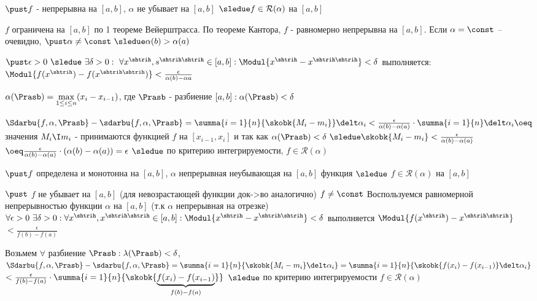 \begin{proofs}
	$\pust f$ - непрерывна на $[a,b]$, $\alpha$ не убывает на $[a,b]$ $\sledue f \in \mathcal{R}(\alpha)$ на $[a,b]$
	\begin{dokvo}
		$f$ ограничена на $[a,b]$ по 1 теореме Вейерштрасса. По теореме Кантора, $f$ - равномерно непрерывна на $[a,b]$. Если $\alpha = \const$ -- очевидно, $\pust \alpha \neq \const \ \sledue \alpha(b) > \alpha(a)$

		$\pust \epsilon > 0 \ \sledue \ \exists \delta >0: \ \forall x^{\shtrih}, s^{\shtrih\shtrih} \in [a,b]: \Modul{x^{\shtrih} - x^{\shtrih\shtrih}} < \delta$ выполняется: $\Modul{f(x^{\shtrih}) - f(x^{\shtrih\shtrih})} < \frac{\epsilon}{\alpha(b) - \alpha{a}}$

		$\alpha(\Prasb) = \max\limits_{1 \leq i \leq n}(x_i - x_{i-1})$, где $\Prasb$ - разбиение $[a,b]: \alpha(\Prasb) < \delta$

		$\Sdarbu{f,\alpha,\Prasb} - \sdarbu{f,\alpha, \Prasb} = \summa{i=1}{n}{\skobk{M_i - m_i}}\delt\alpha_i < \frac{\epsilon}{\alpha(b) - \alpha(a)} \cdot \summa{i=1}{n}\delt\alpha_i \oeq$ значения $M_i \I m_i$ - принимаются функцией $f$ на $[x_{i-1}, x_i]$ и так как $\alpha(\Prasb) < \delta \ \sledue \skobk{M_i - m_i} < \frac{\epsilon}{\alpha(b) - \alpha(a)}$ $\oeq \frac{\epsilon}{\alpha(b)- \alpha(a)}\cdot (\alpha(b)- \alpha(a)) = \epsilon$ $\sledue$ по критерию интегрируемости, $f \in \mathcal{R}(\alpha)$
	\end{dokvo}
\end{proofs}

\begin{proofs}
	$\pust f$ определена и монотонна на $[a,b]$, $\alpha$ непрерывная неубывающая на $[a,b]$ функция $\sledue$ $f \in \mathcal{R}(\alpha)$ на $[a,b]$
	\begin{dokvo}
		$\pust$ $f$ не убывает на $[a,b]$ (для невозрастающей функции док->во аналогично) $f \neq \const$ Воспользуемся равномерной непрерывностью функции $\alpha$ на $[a,b]$ (т.к $\alpha$ непрерывная на отрезке)
		$\forall \epsilon > 0 \ \exists \delta > 0 : \forall x^{\shtrih}, x^{\shtrih\shtrih} \in [a,b]: \Modul{x^{\shtrih} - x^{\shtrih\shtrih}} < \delta$
		выполняется $\Modul{f(x^{\shtrih}) - x^{\shtrih\shtrih}}$ $< \frac{\epsilon}{f(b)-f(a)}$

		Возьмем $\forall$ разбиение $\Prasb: \lambda(\Prasb) < \delta$, $\Sdarbu{f,\alpha,\Prasb} - \sdarbu{f,\alpha, \Prasb} = \summa{i=1}{n}{\skobk{M_i - m_i}\delt \alpha_i} = \summa{i=1}{n}{\skobk{f(x_i) - f(x_{i-1})}\delt \alpha_i} $ $< \frac{\epsilon}{f(b) -f(a)} \cdot \summa{i=1}{n}{\skobk{\underbrace{f(x_i) - f(x_{i-1})}_{f(b) - f(a)}}}$
		$\sledue$ по критерию интегрируемости $f \in \mathcal{R}(\alpha)$
	\end{dokvo}
\end{proofs}
